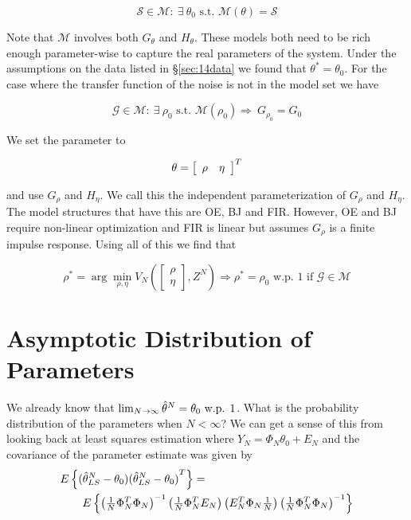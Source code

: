 \begin{equation*}
\mathcal{S}\in\mathcal{M}:~\exists~\theta_0 \text{~s.t.~} \mathcal{M} (\theta)=\mathcal{S}
\end{equation*}

Note that $\mathcal{M}$ involves both $G_\theta$ and $H_\theta$.
These models both need to be rich enough parameter-wise to capture the real parameters of the system.
Under the assumptions on the data listed in \S\ref{sec:14data} we found that $\theta^\ast=\theta_0$.
For the case where the transfer function of the noise is not in the model set we have

\begin{equation*}
\mathcal{G}\in\mathcal{M}:~\exists~\rho_0 \text{~s.t.~} \mathcal{M} (\rho_0) \Rightarrow~G_{\rho_0}=G_0
\end{equation*}

We set the parameter to

\begin{equation*}
\theta= \left[\begin{array}{c c} \rho & \eta \end{array}\right]^T
\end{equation*}

and use $G_\rho$ and $H_\eta$.
We call this the independent parameterization of $G_\rho$ and $H_\eta$.
The model structures that have this are OE, BJ and FIR\@.
However, OE and BJ require non-linear optimization and FIR is linear but assumes $G_\rho$ is a finite impulse response.
Using all of this we find that

\begin{equation*}
\rho^\ast= \arg\min_{\rho,\eta} V_N\left(\left[\begin{array}{c} \rho \\ \eta \end{array}\right],Z^N\right) \Rightarrow\rho^\ast= \rho_0 \text{~w.p.~} 1 \text{~if~} \mathcal{G}\in\mathcal{M}
\end{equation*}

\section{Asymptotic Distribution of Parameters}
We already know that $\lim_{N\to\infty}\hat{\theta}^N=\theta_0 \text{ w.p. } 1$.
What is the probability distribution of the parameters when $N<\infty$? We can get a sense of this from looking back at least squares estimation where $Y_N=\Phi_N\theta_0+E_N$ and the covariance of the parameter estimate was given by
\begin{align*}
&E\left\lbrace (\hat{\theta}_{LS}^N-\theta_0){(\hat{\theta}_{LS}^N-\theta_0)}^T\right\rbrace = \\
&\qquad E\left\lbrace {\left(\tfrac{1}{N}\Phi_N^T\Phi_N\right)}^{-1} \left(\tfrac{1}{N}\Phi_N^T E_N\right) \left(E_N^T\Phi_N\tfrac{1}{N}\right) {\left(\tfrac{1}{N}\Phi_N^T\Phi_N\right)}^{-1} \right\rbrace
\end{align*}

